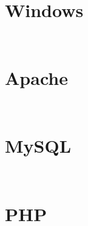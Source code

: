 \section{Windows}


\begin{lstlisting}[language=bash]

\end{lstlisting}




\begin{lstlisting}[language=bash]

\end{lstlisting}



\section{Apache}


\begin{lstlisting}[language=bash]

\end{lstlisting}



\begin{lstlisting}[language=bash]

\end{lstlisting}


\section{MySQL}


\begin{lstlisting}[language=bash]

\end{lstlisting}




\begin{lstlisting}[language=bash]

\end{lstlisting}


\section{PHP}


\begin{lstlisting}[language=bash]

\end{lstlisting}




\begin{lstlisting}[language=bash]

\end{lstlisting}




